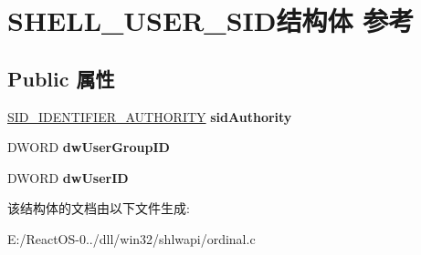 \hypertarget{struct_s_h_e_l_l___u_s_e_r___s_i_d}{}\section{S\+H\+E\+L\+L\+\_\+\+U\+S\+E\+R\+\_\+\+S\+I\+D结构体 参考}
\label{struct_s_h_e_l_l___u_s_e_r___s_i_d}
\subsection*{Public 属性}
\begin{DoxyCompactItemize}
\item 
\mbox{\label{struct_s_h_e_l_l___u_s_e_r___s_i_d_ac456d124d1ab9fd395b1aa06029bc0d8}} 
\hyperlink{struct___s_i_d___i_d_e_n_t_i_f_i_e_r___a_u_t_h_o_r_i_t_y}{S\+I\+D\+\_\+\+I\+D\+E\+N\+T\+I\+F\+I\+E\+R\+\_\+\+A\+U\+T\+H\+O\+R\+I\+TY} {\bfseries sid\+Authority}
\item 
\mbox{\label{struct_s_h_e_l_l___u_s_e_r___s_i_d_a90b94f2b8e2a7432d936e0a29f5a98f2}} 
D\+W\+O\+RD {\bfseries dw\+User\+Group\+ID}
\item 
\mbox{\label{struct_s_h_e_l_l___u_s_e_r___s_i_d_a17671ee83b58a5fab6a7facb35aec38b}} 
D\+W\+O\+RD {\bfseries dw\+User\+ID}
\end{DoxyCompactItemize}


该结构体的文档由以下文件生成\+:\begin{DoxyCompactItemize}
\item 
E\+:/\+React\+O\+S-\/0../dll/win32/shlwapi/ordinal.\+c\end{DoxyCompactItemize}
